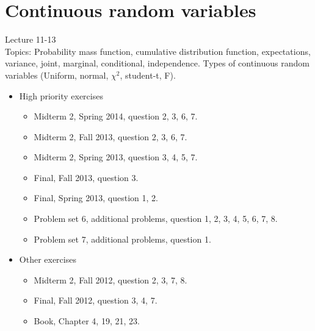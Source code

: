 \documentclass[11pt]{article}
\begin{document}
\section{Continuous random variables}
Lecture 11-13\\[0.2in]
Topics: Probability mass function, cumulative distribution function, expectations, variance, joint, marginal, conditional, independence. Types of continuous random variables (Uniform, normal, $\chi^2$, student-t, F). 
\begin{itemize}
	\item High priority exercises
		\begin{itemize}
			\item Midterm 2, Spring 2014, question 2, 3, 6, 7.
			\item Midterm 2, Fall 2013, question 2, 3, 6, 7.
			\item Midterm 2, Spring 2013, question 3, 4, 5, 7.
			\item Final, Fall 2013, question 3.
			\item Final, Spring 2013, question 1, 2.
			\item Problem set 6, additional problems, question 1, 2, 3, 4, 5, 6, 7, 8. 
			\item Problem set 7, additional problems, question 1.
		\end{itemize}
	\item Other exercises
	\begin{itemize}
		\item Midterm 2, Fall 2012, question 2, 3, 7, 8.
		\item Final, Fall 2012, question 3, 4, 7.
		\item Book, Chapter 4, 19, 21, 23.
	\end{itemize}
\end{itemize}
\end{document}
